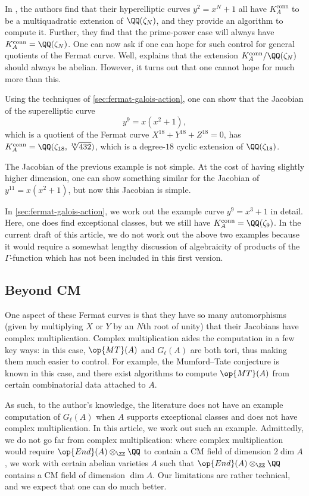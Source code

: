 \documentclass[openany]{book}
\begin{document}
In \cite[Theorem~7.1.1]{ggl-fermat}, the authors find that their hyperelliptic curves $y^2=x^N+1$ all have $K_A^{\mathrm{conn}}$ to be a multiquadratic extension of $\QQ(\zeta_N)$, and they provide an algorithm to compute it. Further, they find that the prime-power case will always have $K_A^{\mathrm{conn}}=\QQ(\zeta_N)$. One can now ask if one can hope for such control for general quotients of the Fermat curve. Well, \cite[Theorem~7.15]{deligne-hodge} explains that the extension $K_A^{\mathrm{conn}}/\QQ(\zeta_N)$ should always be abelian. However, it turns out that one cannot hope for much more than this.
\begin{example}
	Using the techniques of \cref{sec:fermat-galois-action}, one can show that the Jacobian of the superelliptic curve
	\[y^9=x\left(x^2+1\right),\]
	which is a quotient of the Fermat curve $X^{18}+Y^{18}+Z^{18}=0$, has $K_A^{\mathrm{conn}}=\QQ(\zeta_{18},\sqrt[18]{432})$, which is a degree-$18$ cyclic extension of $\QQ(\zeta_{18})$.
\end{example}
\begin{example}
	The Jacobian of the previous example is not simple. At the cost of having slightly higher dimension, one can show something similar for the Jacobian of $y^{11}=x\left(x^2+1\right)$, but now this Jacobian is simple.
\end{example}
In \cref{sec:fermat-galois-action}, we work out the example curve $y^9=x^3+1$ in detail. Here, one does find exceptional classes, but we still have $K_A^{\mathrm{conn}}=\QQ(\zeta_9)$. In the current draft of this article, we do not work out the above two examples because it would require a somewhat lengthy discussion of algebraicity of products of the $\Gamma$-function which has not been included in this first version.

\subsection{Beyond CM}
One aspect of these Fermat curves is that they have so many automorphisms (given by multiplying $X$ or $Y$ by an $N$th root of unity) that their Jacobians have complex multiplication. Complex multiplication aides the computation in a few key ways: in this case, $\op{MT}(A)$ and $G_\ell(A)$ are both tori, thus making them much easier to control. For example, the Mumford--Tate conjecture is known in this case, and there exist algorithms to compute $\op{MT}(A)$ from certain combinatorial data attached to $A$.

As such, to the author's knowledge, the literature does not have an example computation of $G_\ell(A)$ when $A$ supports exceptional classes and does not have complex multiplication. In this article, we work out such an example. Admittedly, we do not go far from complex multiplication: where complex multiplication would require $\op{End}(A)\otimes_\ZZ\QQ$ to contain a CM field of dimension $2\dim A$, we work with certain abelian varieties $A$ such that $\op{End}(A)\otimes_\ZZ\QQ$ contains a CM field of dimension $\dim A$. Our limitations are rather technical, and we expect that one can do much better.
\end{document}
